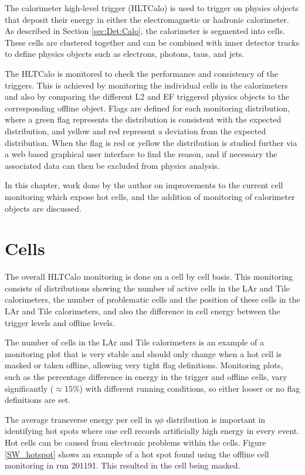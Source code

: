 The calorimeter high-level trigger (HLTCalo) is used to trigger on physics objects that deposit their energy in either the electromagnetic or hadronic calorimeter.
As described in Section \ref{sec:Det:Calo}, the calorimeter is segmented into cells.
These cells are clustered together and can be combined with inner detector tracks to define physics objects such as electrons, photons, taus, and jets. 

The HLTCalo is monitored to check the performance and consistency of the triggers. 
This is achieved by monitoring the individual cells in the calorimeters and also by comparing the different L2 and EF triggered physics objects to the corresponding offline object.
Flags are defined for each monitoring distribution, where a green flag represents the distribution is consistent with the expected distribution, and yellow and red represent a deviation from the expected distribution. 
When the flag is red or yellow the distribution is studied further via a web based graphical user interface to find the reason, and if necessary the associated data can then be excluded from physics analysis.


In this chapter, work done by the author on improvements to the current cell monitoring which expose hot cells, and the addition of monitoring of calorimeter objects are discussed. 

\section{Cells}

The overall HLTCalo monitoring is done on a cell by cell basis.
This monitoring consists of distributions showing the number of active cells in the LAr and Tile calorimeters, the number of problematic cells and the position of these cells in the LAr and Tile calorimeters, and also the difference in cell energy between the trigger levels and offline levels.

The number of cells in the LAr and Tile calorimeters is an example of a monitoring plot that is very stable and should only change when a hot cell is masked or taken offline, allowing very tight flag definitions.
Monitoring plots, such as the percentage difference in energy in the trigger and offline cells, vary significantly ($\approx15\%$) with different running conditions, so either looser or no flag definitions are set.

The average transverse energy per cell in $\eta  \phi$ distribution is important in identifying hot spots where one cell records artificially high energy in every event.
Hot cells can be caused from electronic problems within the cells. 
Figure \ref{SW_hotspot} shows an example of a hot spot found using the offline cell monitoring in run 201191. 
This resulted in the cell being masked.

